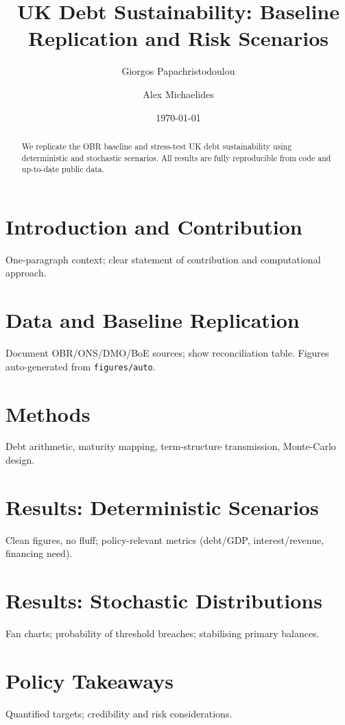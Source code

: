 \documentclass[11pt]{article}
\title{UK Debt Sustainability: Baseline Replication and Risk Scenarios}
\author{Giorgos Papachristodoulou \and Alex Michaelides}
\date{\today}
\begin{document}
\maketitle

\begin{abstract}
We replicate the OBR baseline and stress-test UK debt sustainability using deterministic and stochastic scenarios. All results are fully reproducible from code and up-to-date public data.
\end{abstract}

\section{Introduction and Contribution}
One-paragraph context; clear statement of contribution and computational approach.

\section{Data and Baseline Replication}
Document OBR/ONS/DMO/BoE sources; show reconciliation table. Figures auto-generated from \texttt{figures/auto}.

\section{Methods}
Debt arithmetic, maturity mapping, term-structure transmission, Monte-Carlo design.

\section{Results: Deterministic Scenarios}
Clean figures, no fluff; policy-relevant metrics (debt/GDP, interest/revenue, financing need).

\section{Results: Stochastic Distributions}
Fan charts; probability of threshold breaches; stabilising primary balances.

\section{Policy Takeaways}
Quantified targets; credibility and risk considerations.



\end{document}

